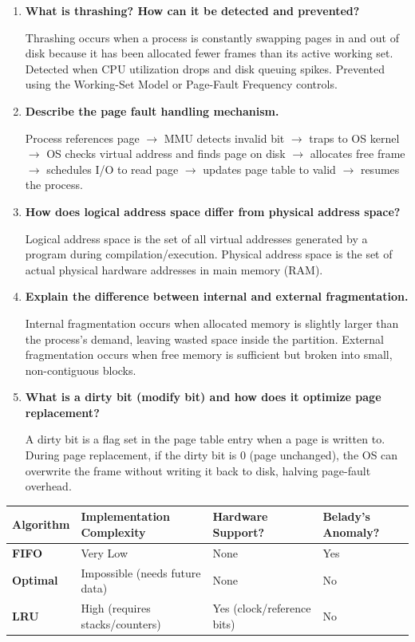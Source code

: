 \documentclass[12pt,a4paper]{article}
\newcommand{\Q}[1]{\textbf{#1}\par\noindent\ignorespaces}
\renewcommand{\arraystretch}{1.45}
\begin{document}
\begin{tcolorbox}[exambox, title={\textbf{Frequently Asked / Viva Questions}}]
\begin{enumerate}[topsep=0pt, label=\textbf{Q\arabic*.}, itemsep=5pt]
  \item \Q{What is thrashing? How can it be detected and prevented?}
    Thrashing occurs when a process is constantly swapping pages in and out of disk because it has been allocated fewer frames than its active working set. Detected when CPU utilization drops and disk queuing spikes. Prevented using the Working-Set Model or Page-Fault Frequency controls.
  \item \Q{Describe the page fault handling mechanism.}
    Process references page $\to$ MMU detects invalid bit $\to$ traps to OS kernel $\to$ OS checks virtual address and finds page on disk $\to$ allocates free frame $\to$ schedules I/O to read page $\to$ updates page table to valid $\to$ resumes the process.
  \item \Q{How does logical address space differ from physical address space?}
    Logical address space is the set of all virtual addresses generated by a program during compilation/execution. Physical address space is the set of actual physical hardware addresses in main memory (RAM).
  \item \Q{Explain the difference between internal and external fragmentation.}
    Internal fragmentation occurs when allocated memory is slightly larger than the process's demand, leaving wasted space inside the partition. External fragmentation occurs when free memory is sufficient but broken into small, non-contiguous blocks.
  \item \Q{What is a dirty bit (modify bit) and how does it optimize page replacement?}
    A dirty bit is a flag set in the page table entry when a page is written to. During page replacement, if the dirty bit is 0 (page unchanged), the OS can overwrite the frame without writing it back to disk, halving page-fault overhead.
\end{enumerate}
\end{tcolorbox}

\begin{tcolorbox}[tikzbox, title={Page Replacement Algorithms summary}]
\renewcommand{\arraystretch}{1.4}
\par\noindent
\begin{tabularx}{\linewidth}{|B{2.2cm}|>{\small\centering\arraybackslash}X|>{\small\centering\arraybackslash}X|>{\small\centering\arraybackslash}X|}
\hline
\textbf{Algorithm} & \textbf{\color{myred}Implementation Complexity} & \textbf{\color{myteal}Hardware Support?} & \textbf{\color{myamber}Belady's Anomaly?} \\
\hline
\textbf{FIFO} & Very Low & None & Yes \\
\hline
\textbf{Optimal} & Impossible (needs future data) & None & No \\
\hline
\textbf{LRU} & High (requires stacks/counters) & Yes (clock/reference bits) & No \\
\hline
\end{tabularx}
\end{tcolorbox}
\end{document}
